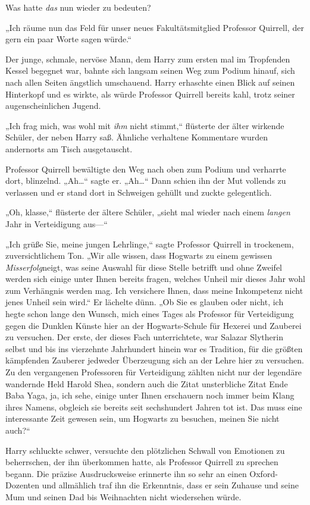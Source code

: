 {Was hatte \emph{das} nun wieder zu bedeuten?

„Ich räume nun das Feld für unser neues Fakultätsmitglied Professor Quirrell, der gern ein paar Worte sagen würde.“

Der junge, schmale, nervöse Mann, dem Harry zum ersten mal im Tropfenden Kessel begegnet war, bahnte sich langsam seinen Weg zum Podium hinauf, sich nach allen Seiten ängstlich umschauend. Harry erhaschte einen Blick auf seinen Hinterkopf und es wirkte, als würde Professor Quirrell bereits kahl, trotz seiner augenscheinlichen Jugend.

„Ich frag mich, was wohl mit \emph{ihm} nicht stimmt,“ flüsterte der älter wirkende Schüler, der neben Harry saß. Ähnliche verhaltene Kommentare wurden andernorts am Tisch ausgetauscht.

Professor Quirrell bewältigte den Weg nach oben zum Podium und verharrte dort, blinzelnd. „Ah…“ sagte er. „Ah…“ Dann schien ihn der Mut vollends zu verlassen und er stand dort in Schweigen gehüllt und zuckte gelegentlich.

„Oh, klasse,“ flüsterte der ältere Schüler, „sieht mal wieder nach einem \emph{langen} Jahr in Verteidigung aus—“

„Ich grüße Sie, meine jungen Lehrlinge,“ sagte Professor Quirrell in trockenem, zuversichtlichem Ton. „Wir alle wissen, dass Hogwarts zu einem gewissen \emph{Misserfolg}neigt, was seine Auswahl für diese Stelle betrifft und ohne Zweifel werden sich einige unter Ihnen bereits fragen, welches Unheil mir dieses Jahr wohl zum Verhängnis werden mag. Ich versichere Ihnen, dass meine Inkompetenz nicht jenes Unheil sein wird.“ Er lächelte dünn. „Ob Sie es glauben oder nicht, ich hegte schon lange den Wunsch, mich eines Tages als Professor für Verteidigung gegen die Dunklen Künste hier an der Hogwarts-Schule für Hexerei und Zauberei zu versuchen. Der erste, der dieses Fach unterrichtete, war Salazar Slytherin selbst und bis ins vierzehnte Jahrhundert hinein war es Tradition, für die größten kämpfenden Zauberer jedweder Überzeugung sich an der Lehre hier zu versuchen. Zu den vergangenen Professoren für Verteidigung zählten nicht nur der legendäre wandernde Held Harold Shea, sondern auch die Zitat unsterbliche Zitat Ende Baba Yaga, ja, ich sehe, einige unter Ihnen erschauern noch immer beim Klang ihres Namens, obgleich sie bereits seit sechshundert Jahren tot ist. Das muss eine interessante Zeit gewesen sein, um Hogwarts zu besuchen, meinen Sie nicht auch?“

Harry schluckte schwer, versuchte den plötzlichen Schwall von Emotionen zu beherrschen, der ihn überkommen hatte, als Professor Quirrell zu sprechen begann. Die präzise Ausdrucksweise erinnerte ihn so sehr an einen Oxford-Dozenten und allmählich traf ihn die Erkenntnis, dass er sein Zuhause und seine Mum und seinen Dad bis Weihnachten nicht wiedersehen würde.

}
